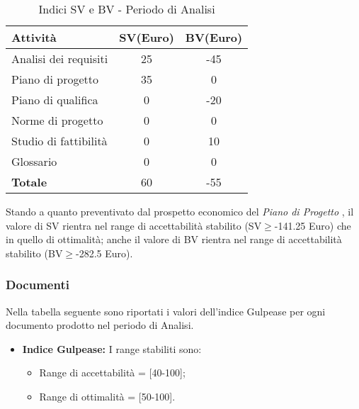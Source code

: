        
      \begin{table}[H]
        \centering
        \begin{tabular}{|l|c|c|}
          \hline
          \textbf{Attività} &\textbf{SV}(Euro)  &\textbf{BV}(Euro) \\
          \hline
          Analisi dei requisiti  &25 &-45  \\
          Piano di progetto &35  &0\\
          Piano di qualifica  &0  &-20\\
          Norme di progetto &0  &0 \\
          Studio di fattibilità &0  &10  \\
          Glossario &0  &0  \\
          \hline
          \textbf{Totale} &60  &-55  \\
          \hline
        \end{tabular}
        \caption{Indici SV e BV - Periodo di Analisi}
      \end{table}
      Stando a quanto preventivato dal prospetto economico del \emph{Piano di Progetto \VersionePP{}}, il valore di SV rientra nel range di accettabilità stabilito (SV\(\geq\)-141.25 Euro) che in quello di ottimalità;
      anche il valore di BV rientra nel range di accettabilità stabilito (BV\(\geq\)-282.5 Euro).
      \subsubsection{Documenti}
      Nella tabella seguente sono riportati i valori dell'indice Gulpease per ogni documento prodotto nel periodo di Analisi.\\

\begin{itemize}
\item \textbf{Indice Gulpease: }I range stabiliti sono:
      \begin{itemize}
        \item Range di accettabilità = [40-100];
        \item Range di ottimalità = [50-100].
      \end{itemize}
\end{itemize}      
      
